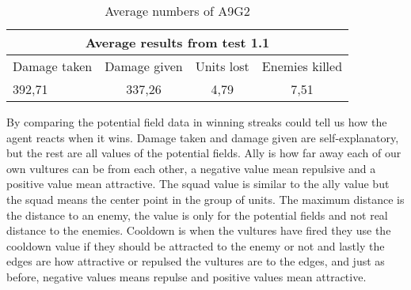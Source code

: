 \begin{centering}
\begin{table}
 \begin{tabular}{|l|c|c|c|}
	\multicolumn{4}{c}{Average results from test 1.1} \\
	\hline
		Damage taken & Damage given & Units lost & Enemies killed\\
	\hline
		392,71 & 337,26 & 4,79 & 7,51 \\
	\hline
\end{tabular}
\caption{Average numbers of A9G2}
\label{test1.1}
\end{table}
\end{centering}
\newpage
By comparing the potential field data in winning streaks could tell us how the agent reacts when it wins. Damage taken and damage given are self-explanatory, but the rest are all values of the potential fields. Ally is how far away each of our own vultures can be from each other, a negative value mean repulsive and a positive value mean attractive. The squad value is similar to the ally value but the squad means the center point in the group of units. The maximum distance is the distance to an enemy, the value is only for the potential fields and not real distance to the enemies. Cooldown is when the vultures have fired they use the cooldown value if they should be attracted to the enemy or not and lastly the edges are how attractive or repulsed the vultures are to the edges, and just as before, negative values means repulse and positive values mean attractive. 
\newpage
